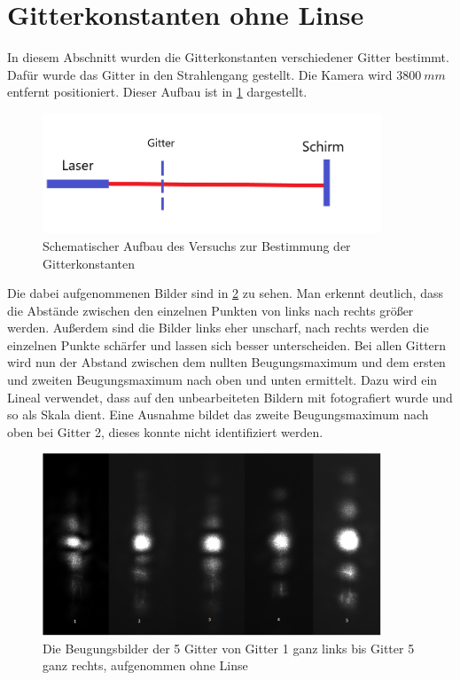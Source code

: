 \section{Gitterkonstanten ohne Linse}
In diesem Abschnitt wurden die Gitterkonstanten verschiedener Gitter bestimmt. Dafür wurde das Gitter in den Strahlengang gestellt. Die Kamera wird $\SI{3800}{mm}$ entfernt positioniert. Dieser Aufbau ist in \cref{aufbaugitter} dargestellt.

\begin{figure}[h]
	\centering
	\includegraphics[width=0.9\textwidth]{Lana-Bild2.png}
	\caption{Schematischer Aufbau des Versuchs zur Bestimmung der Gitterkonstanten}
	\label{aufbaugitter}
\end{figure}

Die dabei aufgenommenen Bilder sind in \cref{gitterfernfeld} zu sehen. Man erkennt deutlich, dass die Abstände zwischen den einzelnen Punkten von links nach rechts größer werden. Außerdem sind die Bilder links eher unscharf, nach rechts werden die einzelnen Punkte schärfer und lassen sich besser unterscheiden. Bei allen Gittern wird nun der Abstand zwischen dem nullten Beugungsmaximum und dem ersten und zweiten Beugungsmaximum nach oben und unten ermittelt. Dazu wird ein Lineal verwendet, dass auf den unbearbeiteten Bildern mit fotografiert wurde und so als Skala dient. Eine Ausnahme bildet das zweite Beugungsmaximum nach oben bei Gitter 2, dieses konnte nicht identifiziert werden. 

\begin{figure}
	\centering
	\includegraphics[width=0.9\textwidth]{gitter_fernfeld.png}
	\caption{Die Beugungsbilder der 5 Gitter von Gitter 1 ganz links bis Gitter 5 ganz rechts, aufgenommen ohne Linse}
	\label{gitterfernfeld}
\end{figure}

